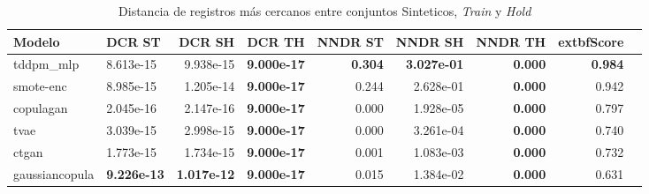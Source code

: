 \begin{table}[H]
\centering
\caption{Distancia de registros más cercanos entre conjuntos Sinteticos, \emph{Train} y \emph{Hold}}
\label{table-dcr-economicos-b-1}
\begin{tabular}{|l|l|r|r|r|r|r|r|r|}
\hline
\rowcolor[gray]{0.8}
Modelo & DCR ST & DCR SH & DCR TH & NNDR ST & NNDR SH & NNDR TH & 	extbf{Score} \\
\hline tddpm\_mlp & 8.613e-15 & 9.938e-15 & \cellcolor[rgb]{0.9, 0.54, 0.52} \bfseries 9.000e-17 & \bfseries 0.304 & \bfseries 3.027e-01 & \cellcolor[rgb]{0.9, 0.54, 0.52} \bfseries 0.000 & \bfseries 0.984 \\
\hline smote-enc & 8.985e-15 & 1.205e-14 & \cellcolor[rgb]{0.9, 0.54, 0.52} \bfseries 9.000e-17 & 0.244 & 2.628e-01 & \cellcolor[rgb]{0.9, 0.54, 0.52} \bfseries 0.000 & 0.942 \\
\hline copulagan & \cellcolor[rgb]{0.9, 0.54, 0.52} 2.045e-16 & \cellcolor[rgb]{0.9, 0.54, 0.52} 2.147e-16 & \cellcolor[rgb]{0.9, 0.54, 0.52} \bfseries 9.000e-17 & \cellcolor[rgb]{0.9, 0.54, 0.52} 0.000 & \cellcolor[rgb]{0.9, 0.54, 0.52} 1.928e-05 & \cellcolor[rgb]{0.9, 0.54, 0.52} \bfseries 0.000 & 0.797 \\
\hline tvae & 3.039e-15 & 2.998e-15 & \cellcolor[rgb]{0.9, 0.54, 0.52} \bfseries 9.000e-17 & 0.000 & 3.261e-04 & \cellcolor[rgb]{0.9, 0.54, 0.52} \bfseries 0.000 & 0.740 \\
\hline ctgan & 1.773e-15 & 1.734e-15 & \cellcolor[rgb]{0.9, 0.54, 0.52} \bfseries 9.000e-17 & 0.001 & 1.083e-03 & \cellcolor[rgb]{0.9, 0.54, 0.52} \bfseries 0.000 & 0.732 \\
\hline gaussiancopula & \bfseries 9.226e-13 & \bfseries 1.017e-12 & \cellcolor[rgb]{0.9, 0.54, 0.52} \bfseries 9.000e-17 & 0.015 & 1.384e-02 & \cellcolor[rgb]{0.9, 0.54, 0.52} \bfseries 0.000 & 0.631 \\
\hline
\end{tabular}
\end{table}
